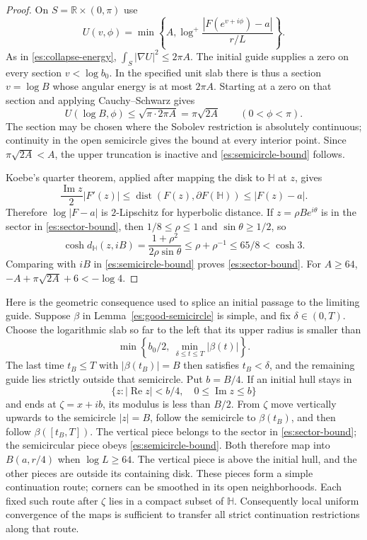 \begin{proof}
On $S=\mathbb R\times(0,\pi)$ use
\[
 U(v,\phi)=\min\left\{A,
          \log^+\frac{|F(e^{v+i\phi})-a|}{r/L}\right\}.
\]
As in \eqref{es:collapse-energy},
$\int_S|\nabla U|^2\le2\pi A$.  The initial guide supplies a zero on
every section $v<\log b_0$.  In the specified unit slab there is thus
a section $v=\log B$ whose angular energy is at most $2\pi A$.
Starting at a zero on that section and applying Cauchy--Schwarz gives
\[
 U(\log B,\phi)\le\sqrt{\pi\cdot2\pi A}
       =\pi\sqrt{2A}\qquad(0<\phi<\pi).
\]
The section may be chosen where the Sobolev restriction is absolutely
continuous; continuity in the open semicircle gives the bound at every
interior point.  Since $\pi\sqrt{2A}<A$, the upper truncation is
inactive and \eqref{es:semicircle-bound} follows.

Koebe's quarter theorem, applied after mapping the disk to
$\mathbb H$ at $z$, gives
\[
 \frac{\operatorname{Im}z}{2}|F'(z)|
 \le\operatorname{dist}(F(z),\partial F(\mathbb H))
 \le |F(z)-a|.
\]
Therefore $\log|F-a|$ is $2$-Lipschitz for hyperbolic distance.
If $z=\rho Be^{i\theta}$ is in the sector in
\eqref{es:sector-bound}, then $1/8\le\rho\le1$ and
$\sin\theta\ge1/2$, so
\[
 \cosh d_{\mathbb H}(z,iB)
   =\frac{1+\rho^2}{2\rho\sin\theta}
   \le\rho+\rho^{-1}\le65/8<\cosh3.
\]
Comparing with $iB$ in \eqref{es:semicircle-bound} proves
\eqref{es:sector-bound}.  For $A\ge64$,
$-A+\pi\sqrt{2A}+6<-\log4$.
\end{proof}

Here is the geometric consequence used to splice an initial passage
to the limiting guide.  Suppose $\beta$ in
Lemma~\ref{es:good-semicircle} is simple, and fix $\delta\in(0,T)$.
Choose the logarithmic slab so far to the left that its upper radius
is smaller than
\[
 \min\left\{b_0/2,\ \min_{\delta\le t\le T}|\beta(t)|\right\}.
\]
The last time $t_B\le T$ with $|\beta(t_B)|=B$ then satisfies
$t_B<\delta$, and the remaining guide lies strictly outside that
semicircle.  Put $b=B/4$.  If an initial hull stays in
\[
 \{z:|\operatorname{Re}z|<b/4,\quad
           0\le\operatorname{Im}z\le b\}
\]
and ends at $\zeta=x+ib$, its modulus is less than $B/2$.
From $\zeta$ move vertically upwards to the semicircle $|z|=B$,
follow the semicircle to $\beta(t_B)$, and then follow
$\beta([t_B,T])$.  The vertical piece belongs to the sector in
\eqref{es:sector-bound}; the semicircular piece obeys
\eqref{es:semicircle-bound}.  Both therefore map into $B(a,r/4)$
when $\log L\ge64$.  The vertical piece is above the initial hull,
and the other pieces are outside its containing disk.  These pieces
form a simple continuation route; corners can be smoothed in its
open neighborhoods.  Each fixed such route after $\zeta$ lies in a
compact subset of $\mathbb H$.  Consequently local uniform
convergence of the maps is sufficient to transfer all strict
continuation restrictions along that route.


